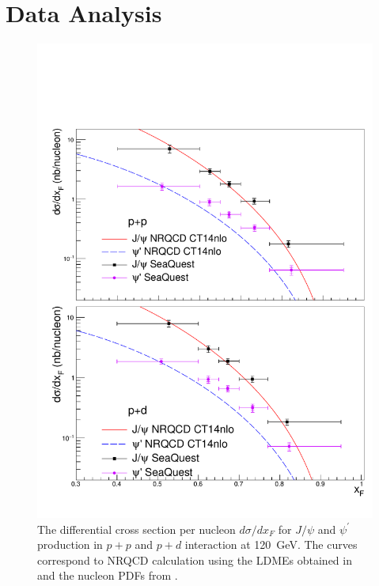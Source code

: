 \documentclass[reprint,aps,unsortedaddress,superscriptaddress,prl,floatfix,showpacs,linenumbers]{revtex4-2}
\begin{document}


\section{Data Analysis}

\begin{figure}[tb]
	\includegraphics*[width=\linewidth]{crossSections/xF/cs_xF_full}
	\caption{The differential cross
		section per nucleon $d\sigma / d x_F$ for $J/\psi$ and $\psi^\prime$
		production in $p+p$ and $p+d$ interaction at \SI{120}{\GeV}.
		The curves correspond to NRQCD calculation using the LDMEs obtained
		in \cite{chang2023} and the nucleon PDFs from \cite{hou2021}.}
	\label{fig:cs_xF}
\end{figure}
\end{document}
